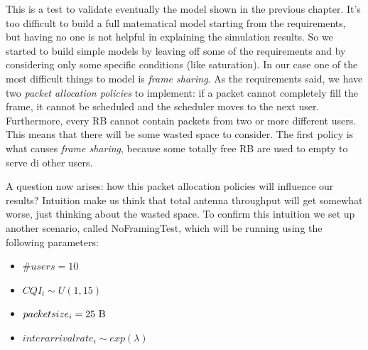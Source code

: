 This is a test to validate eventually the model shown in the previous chapter. It's too difficult to build a full matematical model starting from the requirements, but having no one is not helpful in explaining the simulation results. So we started to build simple models by leaving off some of the requirements and by considering only some specific conditions (like saturation). In our case one of the most difficult things to model is \textit{frame sharing}.
As the requirements said, we have two \textit{packet allocation policies} to implement: if a packet cannot completely fill the frame, it cannot be scheduled and the scheduler moves to the next user. Furthermore, every RB cannot contain packets from two or more different users. This means that there will be some wasted space to consider.
The first policy is what causes \textit{frame sharing}, because some totally free RB are used to empty to serve di other users.

A question now arises: how this packet allocation policies will influence our results? Intuition make us think that total antenna throughput will get somewhat worse, just thinking about the wasted space.
To confirm this intuition we set up another scenario, called NoFramingTest, which will be running using the following parameters:

\begin{itemize}
	\item \(\#users = 10\)
	\item \(CQI_i \sim U(1,15)\)
	\item \(packetsize_i=25 \textnormal{ B}\)
	\item \(interarrivalrate_i \sim exp(\lambda)\)
\end{itemize}

